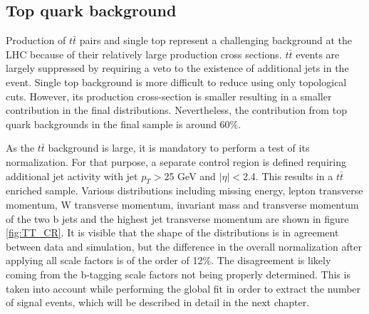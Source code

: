 \subsection{Top quark background}

Production of $t\bar{t}$ pairs and single top represent a challenging background at the LHC because of their relatively large production cross sections. $t\bar{t}$ events are largely suppressed by requiring a veto to the existence of additional jets in the event. Single top background is more difficult to reduce using only topological cuts. However, its production cross-section is smaller resulting in a smaller contribution in the final distributions. Nevertheless, the contribution from top quark backgrounds in the final sample is around 60$\%$.
\par As the $t\bar{t}$ background is large, it is mandatory to perform a test of its normalization. For that purpose, a separate control region is defined requiring additional jet activity with jet $p_T>$25 GeV and $|\eta|<$2.4. This results in a $t\bar{t}$ enriched sample. Various distributions including missing energy, lepton transverse momentum, W transverse momentum, invariant mass and transverse momentum of the two b jets and the highest jet transverse momentum are shown in figure \ref{fig:TT_CR}. It is visible that the shape of the distributions is in agreement between data and simulation, but the difference in the overall normalization after applying all scale factors is of the order of 12$\%$. The disagreement is likely coming from the b-tagging scale factors not being properly determined. This is taken into account while performing the global fit in order to extract the number of signal events, which will be described in detail in the next chapter. 
